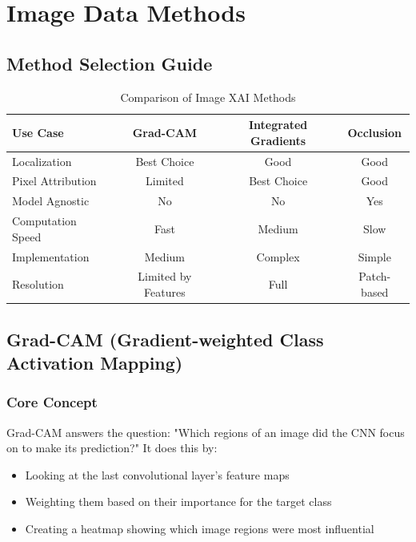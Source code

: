 \documentclass{article}
\begin{document}
\pagebreak
\section{Image Data Methods}

\subsection{Method Selection Guide}
\begin{table}[h]
\caption{Comparison of Image XAI Methods}
\begin{center}
\small
\begin{tabular}{|l|c|c|c|}
\hline
\textbf{Use Case} & \textbf{Grad-CAM} & \textbf{Integrated Gradients} & \textbf{Occlusion} \\
\hline
Localization & Best Choice & Good & Good \\
\hline
Pixel Attribution & Limited & Best Choice & Good \\
\hline
Model Agnostic & No & No & Yes \\
\hline
Computation Speed & Fast & Medium & Slow \\
\hline
Implementation & Medium & Complex & Simple \\
\hline
Resolution & Limited by Features & Full & Patch-based \\
\hline
\end{tabular}
\end{center}
\end{table}

\subsection{Grad-CAM (Gradient-weighted Class Activation Mapping)}

\subsubsection{Core Concept}
Grad-CAM answers the question: "Which regions of an image did the CNN focus on to make its prediction?" It does this by:
\begin{itemize}
    \item Looking at the last convolutional layer's feature maps
    \item Weighting them based on their importance for the target class
    \item Creating a heatmap showing which image regions were most influential
\end{itemize}
\end{document}
